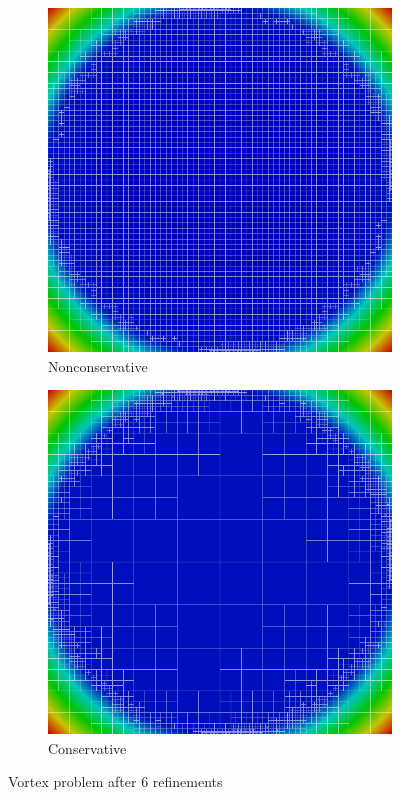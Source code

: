 \documentclass[letterpaper]{article}
\begin{document}
\begin{figure}[p]
\centering
\begin{subfigure}[t]{0.45\textwidth}
\centering
\includegraphics[width=\textwidth]{figs/Vortex/modified6nc.png}
\caption{Nonconservative}
\label{fig:vortexModified6nc}
\end{subfigure}
\begin{subfigure}[t]{0.45\textwidth}
\centering
\includegraphics[width=\textwidth]{figs/Vortex/modified6c.png}
\caption{Conservative}
\label{fig:vortexModified6c}
\end{subfigure}
\caption{Vortex problem after 6 refinements}
\label{fig:vortex}
\end{figure}
\end{document}
